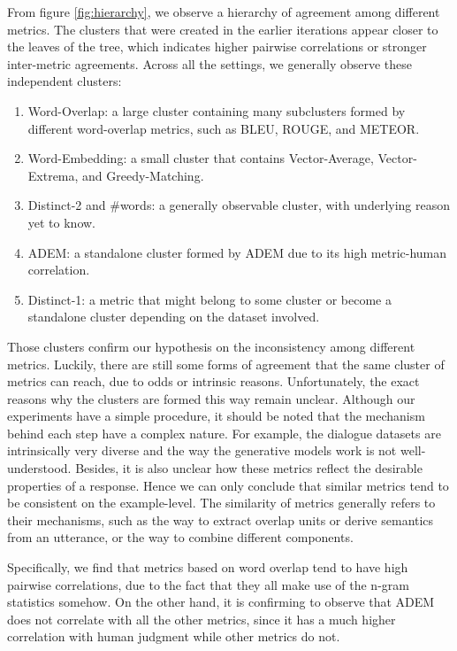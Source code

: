 \documentclass[runningheads]{llncs}
\begin{document}
    From figure \ref{fig:hierarchy}, we observe a hierarchy of agreement among different metrics. The clusters that were created in the earlier iterations appear closer to the leaves of the tree, which indicates higher pairwise correlations or stronger inter-metric agreements. Across all the settings, we generally observe these independent clusters:
    \begin{enumerate}
        \item Word-Overlap: a large cluster containing many subclusters formed by different word-overlap metrics, such as BLEU, ROUGE, and METEOR.
        \item Word-Embedding: a small cluster that contains Vector-Average, Vector-Extrema, and Greedy-Matching.
        \item Distinct-2 and \#words: a generally observable cluster, with underlying reason yet to know.
        \item ADEM: a standalone cluster formed by ADEM due to its high metric-human correlation.
        \item Distinct-1: a metric that might belong to some cluster or become a standalone cluster depending on the dataset involved.
    \end{enumerate}
    

    Those clusters confirm our hypothesis on the inconsistency among different metrics. Luckily, there are still some forms of agreement that the same cluster of metrics can reach, due to odds or intrinsic reasons. Unfortunately, the exact reasons why the clusters are formed this way remain unclear. Although our experiments have a simple procedure, it should be noted that the mechanism behind each step have a complex nature. For example, the dialogue datasets are intrinsically very diverse and the way the generative models work is not well-understood. Besides, it is also unclear how these metrics reflect the desirable properties of a response. Hence we can only conclude that similar metrics tend to be consistent on the example-level. The similarity of metrics generally refers to their mechanisms, such as the way to extract overlap units or derive semantics from an utterance, or the way to combine different components.

    Specifically, we find that metrics based on word overlap tend to have high pairwise correlations, due to the fact that they all make use of the n-gram statistics somehow. On the other hand, it is confirming to observe that ADEM does not correlate with all the other metrics, since it has a much higher correlation with human judgment while other metrics do not.
\end{document}
